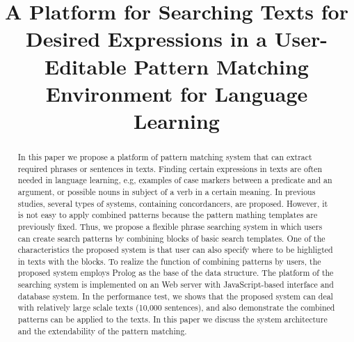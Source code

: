 \documentclass[conference]{IEEEtran}
\begin{document}
\title{A Platform for Searching Texts for Desired Expressions in a User-Editable Pattern Matching Environment for Language Learning\\
}

\author{
\and
{}
}

\maketitle

\begin{abstract}
In this paper we propose a platform of pattern matching system that can extract required phrases or sentences in texts.
Finding certain expressions in texts are often needed in language learning, e.g, examples of case markers
between a predicate and an argument, or possible nouns in subject of a verb in a certain meaning. In previous studies,
several types of systems, containing concordancers, are proposed. However, it is not easy to apply combined
patterns because the pattern mathing templates are previously fixed.
Thus, we propose a flexible phrase searching system in which users can create search patterns
by combining blocks of basic search templates. %
One of the characteristics the proposed system is that user can also specify where to be highligted
in texts with the blocks.
To realize the function of combining patterns by users, the proposed system employs
Prolog as the base of the data structure. The platform of the searching system is implemented
on an Web server with JavaScript-based interface and database system. 
In the performance test, we shows that the proposed system can deal with relatively large sclale texts
(10,000 sentences), and also demonstrate the combined patterns can be applied to the texts.
In this paper we discuss the system architecture and the extendability of the pattern matching. 
\end{abstract}
\end{document}
